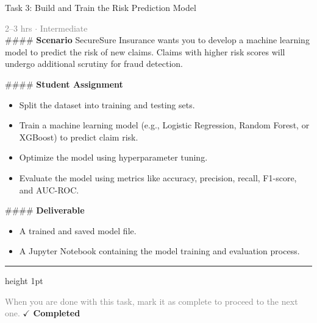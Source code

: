 \documentclass[10pt,a4paper]{article}
\begin{document}
\begin{taskbox}{Task 3: Build and Train the Risk Prediction Model}

    {\small \textcolor{gray}{2--3 hrs $\cdot$ Intermediate}}\\[12pt]

    \#\#\#\# \textbf{Scenario}
SecureSure Insurance wants you to develop a machine learning model to predict the risk of new claims. Claims with higher risk scores will undergo additional scrutiny for fraud detection.

\#\#\#\# \textbf{Student Assignment}
\begin{itemize}
    \item Split the dataset into training and testing sets.
    \item Train a machine learning model (e.g., Logistic Regression, Random Forest, or XGBoost) to predict claim risk.
    \item Optimize the model using hyperparameter tuning.
    \item Evaluate the model using metrics like accuracy, precision, recall, F1-score, and AUC-ROC.
\end{itemize}

\#\#\#\# \textbf{Deliverable}
\begin{itemize}
    \item A trained and saved model file.
    \item A Jupyter Notebook containing the model training and evaluation process.\par
\end{itemize}

    \vspace{16pt}

    \textcolor{cardBorder}{\hrule height 1pt}\vspace{8pt}

    \small \textcolor{gray}{When you are done with this task, mark it as complete to proceed to the next one.} \hfill \textbf{\textcolor{brandDark}{$\checkmark$ Completed}}

\end{taskbox}
\end{document}
